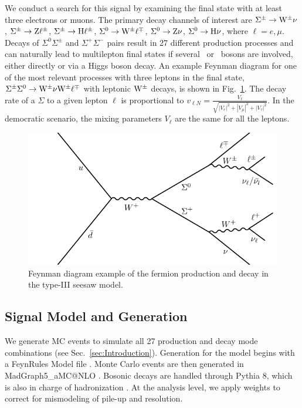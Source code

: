 We conduct a search for this signal by examining the final state with at least three electrons or muons. The primary decay channels of interest are $\Sigma^\pm \to \mathrm{W}^\pm \nu$, $\Sigma^\pm \to \mathrm{Z} \ell^\pm$, $\Sigma^\pm \to \mathrm{H} \ell^\pm$, $\Sigma^0 \to \mathrm{W}^\pm \ell^\mp$, $\Sigma^0 \to \mathrm{Z} \nu$, $\Sigma^0 \to \mathrm{H} \nu$, where $\ell = e, \mu$. Decays of $\Sigma^0 \Sigma^\pm$ and $\Sigma^+ \Sigma^-$ pairs result in 27 different production processes and can naturally lead to multilepton final states if several \PW\ or \Z\ bosons are involved, either directly or via a Higgs boson decay. An example Feynman diagram for one of the most relevant processes with three leptons in the final state, $\Sigma^\pm \Sigma^0 \to \mathrm{W}^\pm \nu \mathrm{W}^\pm \ell^\mp$ with leptonic $\mathrm{W}^\pm$ decays, is shown in Fig.~\ref{fig:SeesawDecay}.
The decay rate of a $\Sigma$ to a given lepton $\ell$ is proportional to $v_{\ell N} = \frac{V_\ell}{\sqrt{|V_e|^2 + |V_\mu|^2 + |V_\tau|^2}}$. In the democratic scenario, the mixing parameters $V_\ell$ are the same for all the leptons.

\begin{figure}
\begin{center}
	\includegraphics[width=.5\textwidth]{Introduction/Seesaw}
	\caption{Feynman diagram example of the fermion production and decay in the type-III seesaw model.
	\label{fig:SeesawDecay}}
\end{center}
\end{figure}


\subsection{Signal Model and Generation}
\label{sec:Samples/Signal}

We generate MC events to simulate all 27 production and decay mode combinations (see Sec.~\ref{sec:Introduction}). Generation for the model begins with a FeynRules Model file \cite{SeesawIII_Biggio}. Monte Carlo events are then generated in MadGraph5\_aMC@NLO \cite{Alwall:2011uj}. Bosonic decays are handled through Pythia 8, which is also in charge of hadronization \cite{Sjostrand:2007gs}. At the analysis level, we apply weights to correct for mismodeling of pile-up and \MET resolution.

